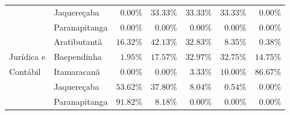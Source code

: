 \begin{table}[h]
\begin{tabular}{ll rrrrr}
                & Jaquereçaba             &               $0.00\%$ &        $33.33\%$ &       $33.33\%$ &      $33.33\%$ &             $0.00\%$ \\ 
                & Paranapitanga           &               $0.00\%$ &         $0.00\%$ &        $0.00\%$ &       $0.00\%$ &             $0.00\%$ \\ 
\midrule{}                                                                                                                          
				& Aratibutantã            &              $16.32\%$ &        $42.13\%$ &       $32.83\%$ &       $8.35\%$ &             $0.38\%$\\ 
Jurídica e      & Baependinha             &               $1.95\%$ &        $17.57\%$ &       $32.97\%$ &      $32.75\%$ &            $14.75\%$ \\ 
Contábil		& Itamaracanã             &               $0.00\%$ &         $0.00\%$ &        $3.33\%$ &      $10.00\%$ &            $86.67\%$ \\ 
				& Jaquereçaba             &              $53.62\%$ &        $37.80\%$ &        $8.04\%$ &       $0.54\%$ &             $0.00\%$ \\ 
                & Paranapitanga           &              $91.82\%$ &         $8.18\%$ &        $0.00\%$ &       $0.00\%$ &             $0.00\%$ \\ 
\bottomrule
\end{tabular}
\end{table}

